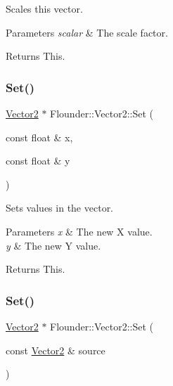 Scales this vector. 


\begin{DoxyParams}{Parameters}
{\em scalar} & The scale factor. \\
\hline
\end{DoxyParams}
\begin{DoxyReturn}{Returns}
This. 
\end{DoxyReturn}
\mbox{\label{class_flounder_1_1_vector2_a984b0507108bfd596d3da63afc3c17ec}} 
\subsubsection{\texorpdfstring{Set()}{Set()}\hspace{0.1cm}{\footnotesize\ttfamily [1/3]}}
{\footnotesize\ttfamily \hyperlink{class_flounder_1_1_vector2}{Vector2} $\ast$ Flounder\+::\+Vector2\+::\+Set (\begin{DoxyParamCaption}\item[{const float \&}]{x,  }\item[{const float \&}]{y }\end{DoxyParamCaption})}



Sets values in the vector. 


\begin{DoxyParams}{Parameters}
{\em x} & The new X value. \\
\hline
{\em y} & The new Y value. \\
\hline
\end{DoxyParams}
\begin{DoxyReturn}{Returns}
This. 
\end{DoxyReturn}
\mbox{\label{class_flounder_1_1_vector2_ad2169829919d5666d689384e6881cbd0}} 
\subsubsection{\texorpdfstring{Set()}{Set()}\hspace{0.1cm}{\footnotesize\ttfamily [2/3]}}
{\footnotesize\ttfamily \hyperlink{class_flounder_1_1_vector2}{Vector2} $\ast$ Flounder\+::\+Vector2\+::\+Set (\begin{DoxyParamCaption}\item[{const \hyperlink{class_flounder_1_1_vector2}{Vector2} \&}]{source }\end{DoxyParamCaption})}



